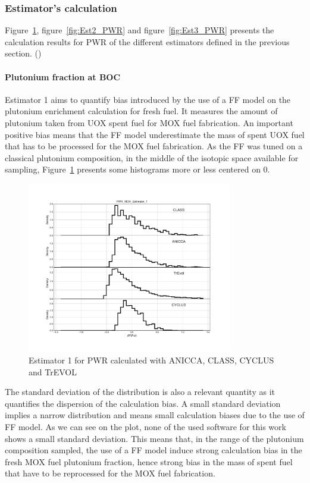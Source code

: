 \subsubsection{Estimator's calculation}

Figure~\ref{fig:Est1_PWR}, figure~\ref{fig:Est2_PWR} and figure~\ref{fig:Est3_PWR} presents the calculation results for PWR of the different estimators defined in the previous section. 
()
\paragraph{Plutonium fraction at BOC}
Estimator 1 aims to quantify bias introduced by the use of a FF model on the plutonium enrichment calculation for fresh fuel. It measures the amount of plutonium taken from UOX spent fuel for MOX fuel fabrication. An important positive bias means that the FF model underestimate the mass of spent UOX fuel that has to be processed for the MOX fuel fabrication. As the FF was tuned on a classical plutonium composition, in the middle of the isotopic space available for sampling, Figure~\ref{fig:Est1_PWR} presents some histograms more or less centered on 0.         

\begin{figure}[h]
	\begin{center}
		\includegraphics[width = 0.8\textwidth]{../../Feature_1/RAW_DATA/FIG/PWR_MOX_Estimator_1.pdf}
		\caption{Estimator 1 for PWR calculated with ANICCA, CLASS, CYCLUS and TrEVOL}
		\label{fig:Est1_PWR}
	\end{center}
\end{figure}

The standard deviation of the distribution is also a relevant quantity as it quantifies the dispersion of the calculation bias. A small standard deviation implies a narrow distribution and means small calculation biases due to the use of FF model. As we can see on the plot, none of the used software for this work shows a small standard deviation. This means that, in the range of the plutonium composition sampled, the use of a FF model induce strong calculation bias in the fresh MOX fuel plutonium fraction, hence strong bias in the mass of spent fuel that have to be reprocessed for the MOX fuel fabrication.

